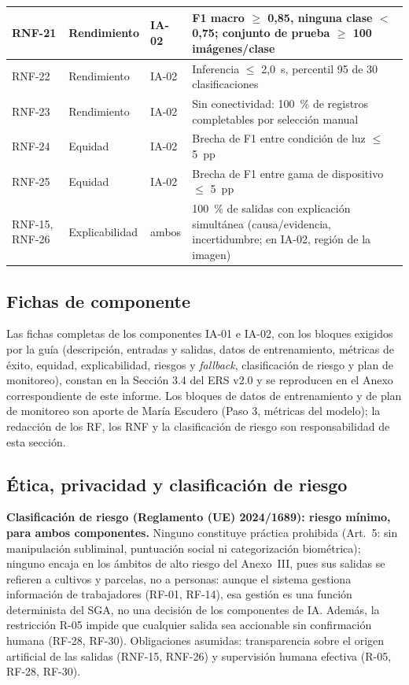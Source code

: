 \begin{center}
\begin{longtable}{|p{1.7cm}|p{2.4cm}|p{1.4cm}|p{8.2cm}|}
\hline
RNF-21 & Rendimiento & IA-02 & F1 macro $\geq$ 0,85, ninguna clase $<$ 0,75; conjunto de prueba $\geq$ 100 imágenes/clase \\
\hline
RNF-22 & Rendimiento & IA-02 & Inferencia $\leq$ 2,0~s, percentil 95 de 30 clasificaciones \\
\hline
RNF-23 & Rendimiento & IA-02 & Sin conectividad: 100~\% de registros completables por selección manual \\
\hline
RNF-24 & Equidad & IA-02 & Brecha de F1 entre condición de luz $\leq$ 5~pp \\
\hline
RNF-25 & Equidad & IA-02 & Brecha de F1 entre gama de dispositivo $\leq$ 5~pp \\
\hline
RNF-15, RNF-26 & Explicabilidad & ambos & 100~\% de salidas con explicación simultánea (causa/evidencia, incertidumbre; en IA-02, región de la imagen) \\
\end{longtable}
\end{center}

\subsection{Fichas de componente}

Las fichas completas de los componentes IA-01 e IA-02, con los bloques exigidos por la guía (descripción, entradas y salidas, datos de entrenamiento, métricas de éxito, equidad, explicabilidad, riesgos y \emph{fallback}, clasificación de riesgo y plan de monitoreo), constan en la Sección 3.4 del ERS v2.0 y se reproducen en el Anexo correspondiente de este informe. Los bloques de datos de entrenamiento y de plan de monitoreo son aporte de María Escudero (Paso 3, métricas del modelo); la redacción de los RF, los RNF y la clasificación de riesgo son responsabilidad de esta sección.

\subsection{Ética, privacidad y clasificación de riesgo}

\textbf{Clasificación de riesgo (Reglamento (UE) 2024/1689): riesgo mínimo, para ambos componentes.} Ninguno constituye práctica prohibida (Art.~5: sin manipulación subliminal, puntuación social ni categorización biométrica); ninguno encaja en los ámbitos de alto riesgo del Anexo~III, pues sus salidas se refieren a cultivos y parcelas, no a personas: aunque el sistema gestiona información de trabajadores (RF-01, RF-14), esa gestión es una función determinista del SGA, no una decisión de los componentes de IA. Además, la restricción R-05 impide que cualquier salida sea accionable sin confirmación humana (RF-28, RF-30). Obligaciones asumidas: transparencia sobre el origen artificial de las salidas (RNF-15, RNF-26) y supervisión humana efectiva (R-05, RF-28, RF-30).

